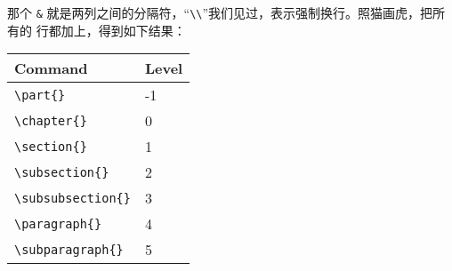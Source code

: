 那个 \verb'&' 就是两列之间的分隔符，``\verb'\\'''我们见过，表示强制换行。照猫画虎，把所有的
行都加上，得到如下结果：

\begin{codeblock}[.9]
\begin{latexcode}
 
  \begin{center}
    \begin{tabular}{ll}
      \hline 
      Command & Level \\ \hline
      \verb|\part{}| & -1 \\
      \verb|\chapter{}| & 0 \\
      \verb|\section{}| & 1 \\
      \verb|\subsection{}| & 2 \\
      \verb|\subsubsection{}| & 3 \\
      \verb|\paragraph{}| & 4 \\
      \verb|\subparagraph{}| & 5 \\
      \hline
    \end{tabular}
  \end{center}
\end{latexcode}
\end{codeblock}

